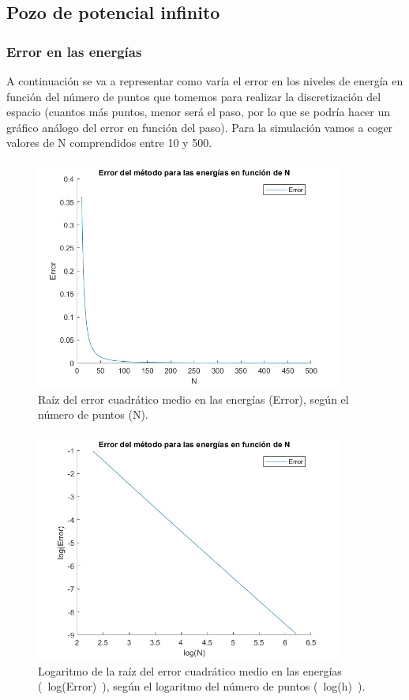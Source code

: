 \documentclass[12pt]{article}
\begin{document}
    \subsection{Pozo de potencial infinito}

    \subsubsection{Error en las energías}

    A continuación se va a representar como varía el error en los niveles de energía en función del número de puntos que tomemos para realizar la discretización del espacio (cuantos más puntos, menor será el paso, por lo que se podría hacer un gráfico análogo del error en función del paso). Para la simulación vamos a coger valores de N comprendidos entre 10 y 500. 

    \begin{figure}[H]
        \centering
        \includegraphics[width=0.9\textwidth]{fotos/error_ener_infinito_500.jpg}
        \caption{Raíz del error cuadrático medio en las energías (Error), según el número de puntos (N).}
        \end{figure} 

    \begin{figure}[H]
        \centering
        \includegraphics[width=0.9\textwidth]{fotos/logerror_ener_infinito_500.jpg}
        \caption{Logaritmo de la raíz del error cuadrático medio en las energías (~log(Error)~), según el logaritmo del número de puntos (~log(h)~).}
        \end{figure}
\end{document}
